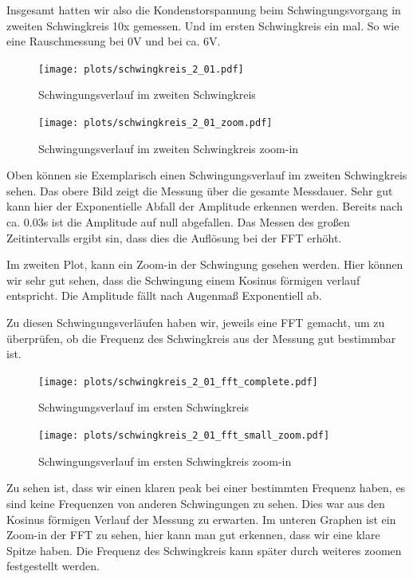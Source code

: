\documentclass[twoside]{protokoll}
\begin{document}
Insgesamt hatten wir also die Kondenstorspannung beim Schwingungsvorgang in zweiten Schwingkreis 10x gemessen. Und im ersten Schwingkreis ein mal. 
So wie eine Rauschmessung bei 0V und bei ca. 6V. 

\begin{figure}[H]
    \centering
    \texttt{[image: plots/schwingkreis\_2\_01.pdf]}
    \caption{Schwingungsverlauf im zweiten Schwingkreis}
\end{figure}


\begin{figure}[H]
    \centering
    \texttt{[image: plots/schwingkreis\_2\_01\_zoom.pdf]}
    \caption{Schwingungsverlauf im zweiten Schwingkreis zoom-in}
\end{figure}

Oben können sie Exemplarisch einen Schwingungsverlauf im zweiten Schwingkreis sehen. 
Das obere Bild zeigt die Messung über die gesamte Messdauer. 
Sehr gut kann hier der Exponentielle Abfall der Amplitude erkennen werden. Bereits nach ca. 0.03s ist die Amplitude auf null abgefallen. 
Das Messen des großen Zeitintervalls ergibt sin, dass dies die Auflösung bei der FFT erhöht.

Im zweiten Plot, kann ein Zoom-in der Schwingung gesehen werden.  Hier können wir sehr gut sehen, dass die Schwingung einem Kosinus förmigen verlauf entspricht.
Die Amplitude fällt nach Augenmaß Exponentiell ab.

Zu diesen Schwingungsverläufen haben wir, jeweils eine FFT gemacht, um zu überprüfen, ob die Frequenz des Schwingkreis aus der Messung gut bestimmbar ist.


\begin{figure}[H]
    \centering
    \texttt{[image: plots/schwingkreis\_2\_01\_fft\_complete.pdf]}
    \caption{Schwingungsverlauf im ersten Schwingkreis}
\end{figure}


\begin{figure}[H]
    \centering
    \texttt{[image: plots/schwingkreis\_2\_01\_fft\_small\_zoom.pdf]}
    \caption{Schwingungsverlauf im ersten Schwingkreis zoom-in}
\end{figure}

Zu sehen ist, dass wir einen klaren peak bei einer bestimmten Frequenz haben, es sind keine Frequenzen von anderen Schwingungen zu sehen. 
Dies war aus den Kosinus förmigen Verlauf der Messung zu erwarten.
Im unteren Graphen ist ein Zoom-in der FFT zu sehen, hier kann man gut erkennen, dass wir eine klare Spitze haben. 
Die Frequenz des Schwingkreis kann später durch weiteres zoomen festgestellt werden.
\end{document}
